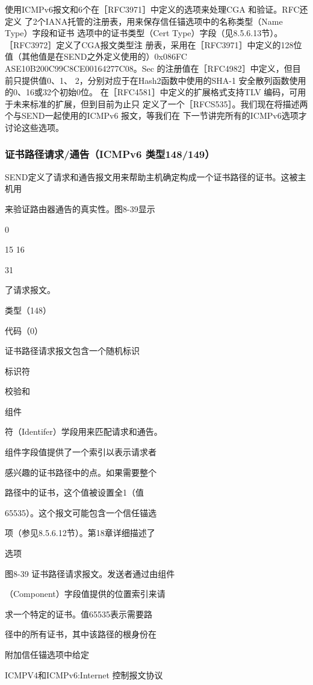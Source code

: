 使用ICMPv6报文和6个在［RFC3971］中定义的选项来处理CGA 和验证。RFC还定义
了2个IANA托管的注册表，用来保存信任锚选项中的名称类型（Name Type）字段和证书
选项中的证书类型（Cert Type）字段（见8.5.6.13节）。［RFC3972］定义了CGA报文类型注
册表，采用在［RFC3971］中定义的128位值（其他值是在SEND之外定义使用的）0x086FC
ASE10B200C99C8CE00164277C08。Sec 的注册值在［RFC4982］中定义，但目前只提供值0、1、
2，分别对应于在Hash2函数中使用的SHA-1 安全散列函数使用的0、16或32个初始0位。
在［RFC4581］中定义的扩展格式支持TLV 编码，可用于未来标准的扩展，但到目前为止只
定义了一个［RFCS535］。我们现在将描述两个与SEND一起使用的ICMPv6 报文，等我们在
下一节讲完所有的ICMPv6选项才讨论这些选项。

\subsubsection{证书路径请求/通告（ICMPv6 类型148/149）}
SEND定义了请求和通告报文用来帮助主机确定构成一个证书路径的证书。这被主机用

来验证路由器通告的真实性。图8-39显示

0

15 16

31

了请求报文。

类型（148）

代码（0）

证书路径请求报文包含一个随机标识

标识符

校验和

组件

符（Identifer）学段用来匹配请求和通告。

组件字段值提供了一个索引以表示请求者

感兴趣的证书路径中的点。如果需要整个

路径中的证书，这个值被设置全1（值

65535）。这个报文可能包含一个信任锚选

项（参见8.5.6.12节）。第18章详细描述了

选项

图8-39 证书路径请求报文。发送者通过由组件

（Component）字段值提供的位置索引来请

求一个特定的证书。值65535表示需要路

径中的所有证书，其中该路径的根身份在

附加信任锚选项中给定

ICMPV4和ICMPv6:Internet 控制报文协议

